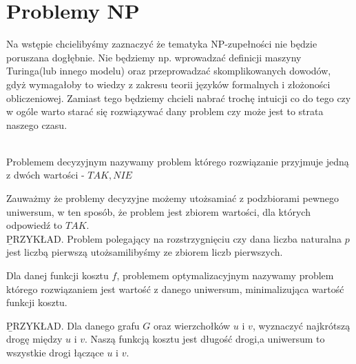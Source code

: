 \section{Problemy NP} %

\label{sec:problemynp}

Na wstępie chcielibyśmy zaznaczyć że tematyka NP-zupełności nie będzie poruszana dogłębnie. 
Nie będziemy np. wprowadzać definicji maszyny Turinga(lub innego modelu) oraz przeprowadzać skomplikowanych dowodów, gdyż wymagałoby to wiedzy z zakresu teorii języków formalnych i złożoności obliczeniowej. 
Zamiast tego będziemy chcieli nabrać trochę intuicji co do tego czy w ogóle warto starać się rozwiązywać dany problem czy może jest to strata naszego czasu.
\\
\\ \noindent
\begin{definition}
Problemem decyzyjnym nazywamy problem którego rozwiązanie przyjmuje jedną z dwóch wartości - $TAK, NIE$
\end{definition}
\noindent
Zauważmy że problemy decyzyjne możemy utożsamiać z podzbiorami pewnego uniwersum, w ten sposób, że problem jest zbiorem wartości, dla których odpowiedź to $TAK$.
\\ \noindent
\b{PRZYKŁAD}. Problem polegający na rozstrzygnięciu czy dana liczba naturalna $p$ jest liczbą pierwszą utożsamilibyśmy ze zbiorem liczb pierwszych.

\begin{definition}
Dla danej funkcji kosztu $f$, problemem optymalizacyjnym nazywamy problem którego rozwiązaniem jest wartość z danego uniwersum, minimalizująca wartość funkcji kosztu.
\end{definition}
\noindent
\b{PRZYKŁAD}. Dla danego grafu $G$ oraz wierzchołków $u$ i $v$, wyznaczyć najkrótszą drogę między $u$ i $v$. 
Naszą funkcją kosztu jest długość drogi,a uniwersum to wszystkie drogi łączące $u$ i $v$.


